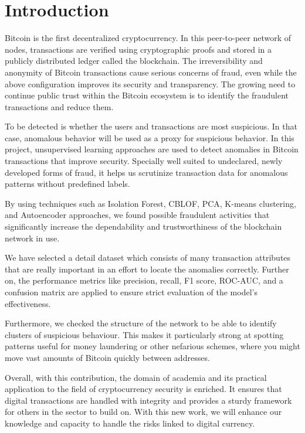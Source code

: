 \documentclass[journal]{IEEEtran}
\begin{document}
\IEEEpeerreviewmaketitle

\section{Introduction}
 Bitcoin is the first decentralized cryptocurrency. In this peer-to-peer network of nodes, transactions are verified using cryptographic proofs and stored in a publicly distributed ledger called the blockchain. The irreversibility and anonymity of Bitcoin transactions cause serious concerns of fraud, even while the above configuration improves its security and transparency. The growing need to continue public trust within the Bitcoin ecosystem is to identify the fraudulent transactions and reduce them.

To be detected is whether the users and transactions are most suspicious. In that case, anomalous behavior will be used as a proxy for suspicious behavior. In this project, unsupervised learning approaches are used to detect anomalies in Bitcoin transactions that improve security. Specially well suited to undeclared, newly developed forms of fraud, it helps us scrutinize transaction data for anomalous patterns without predefined labels.

By using techniques such as Isolation Forest, CBLOF, PCA, K-means clustering, and Autoencoder approaches, we found possible fraudulent activities that significantly increase the dependability and trustworthiness of the blockchain network in use.

We have selected a detail dataset which consists of many transaction attributes that are really important in an effort to locate the anomalies correctly. Further on, the performance metrics like precision, recall, F1 score, ROC-AUC, and a confusion matrix are applied to ensure strict evaluation of the model's effectiveness. 

Furthermore, we checked the structure of the network to be able to identify clusters of suspicious behaviour. This makes it particularly strong at spotting patterns useful for money laundering or other nefarious schemes, where you might move vast amounts of Bitcoin quickly between addresses. 

Overall, with this contribution, the domain of academia and its practical application to the field of cryptocurrency security is enriched. It ensures that digital transactions are handled with integrity and provides a sturdy framework for others in the sector to build on. With this new work, we will enhance our knowledge and capacity to handle the risks linked to digital currency.
\end{document}
